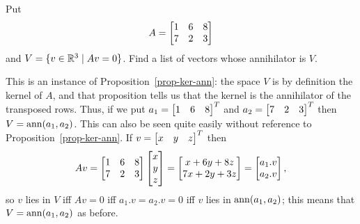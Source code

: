 \documentclass[a4paper]{amsart}
\renewenvironment{solution}{\SolutionInline}{\endSolutionInline}
\begin{document}
\begin{exercise}\label{ex-ann-eqs-i}
 Put 
 \[ A = \left[\begin{matrix} 1 & 6 & 8 \\ 7 & 2 & 3 \end{matrix}\right] \]
 and $V=\{v\in{\mathbb{R}}^3\;|\; Av=0\}$.  Find a list of vectors whose
 annihilator is $V$.
\end{exercise}
\begin{solution}
 This is an instance of Proposition~\ref{prop-ker-ann}: the space $V$
 is by definition the kernel of $A$, and that proposition tells us
 that the kernel is the annihilator of the transposed rows.  Thus, if
 we put $a_1=\left[\begin{matrix} 1&6&8\end{matrix}\right]^T$ and $a_2=\left[\begin{matrix} 7&2&3\end{matrix}\right]^T$ then 
 $V=\operatorname{ann}(a_1,a_2)$.  This can also be seen quite easily without
 reference to Proposition~\ref{prop-ker-ann}.  If $v=\left[\begin{matrix} x&y&z\end{matrix}\right]^T$
 then 
 \[ Av = \left[\begin{matrix} 1 & 6 & 8 \\ 7 & 2 & 3 \end{matrix}\right] \left[\begin{matrix} x \\ y \\ z \end{matrix}\right] =
    \left[\begin{matrix} x+6y+8z \\ 7x+2y+3z \end{matrix}\right] = 
    \left[\begin{matrix} a_1.v \\ a_2.v \end{matrix}\right],
 \]
 so $v$ lies in $V$ iff $Av=0$ iff $a_1.v=a_2.v=0$ iff $v$ lies in
 $\operatorname{ann}(a_1,a_2)$; this means that $V=\operatorname{ann}(a_1,a_2)$ as before.
\end{solution}
\end{document}
